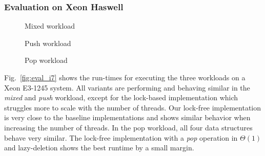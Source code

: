 \subsubsection{Evaluation on Xeon Haswell}
\begin{figure*}[t]
	\centering
	\begin{subfigure}[b]{0.3\textwidth}
		\centering
		
		\caption{Mixed workload}
		\label{fig:xeon_mixed}
	\end{subfigure}
	\hfill
	\begin{subfigure}[b]{0.3\textwidth}
		\centering
		
		\caption{Push workload}
		\label{fig:xeon_push}
	\end{subfigure}
	\hfill
	\begin{subfigure}[b]{0.3\textwidth}
		\centering
		
		\caption{Pop workload}
		\label{fig:xeon_pop}
	\end{subfigure}
	\caption{Runtime for different workloads executed on a Xeon E3-1245 while varying the number of threads}
	\label{fig:eval_i7}
\end{figure*}
Fig.~\ref{fig:eval_i7} shows the run-times for executing the three workloads on a Xeon E3-1245 system. All variants are performing and behaving similar in the \textit{mixed} and \textit{push} workload, except for the lock-based implementation which struggles more to scale with the number of threads. Our lock-free implementation is very close to the baseline implementations and shows similar behavior when increasing the number of threads. In the pop workload, all four data structures behave very similar.
The lock-free implementation with a \textit{pop} operation in $\Theta(1)$ and lazy-deletion shows the best runtime by a small margin.


